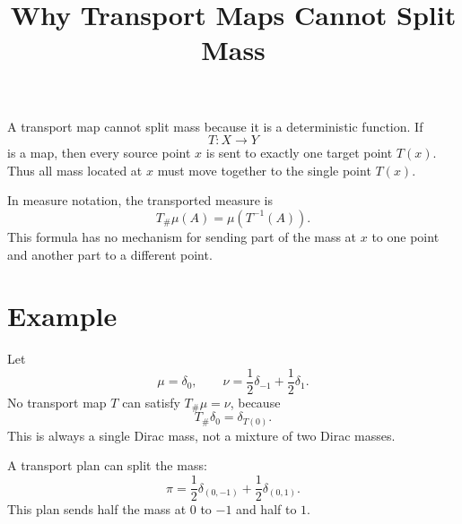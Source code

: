\documentclass[11pt]{article}
\title{Why Transport Maps Cannot Split Mass}
\author{}
\date{}
\begin{document}
\maketitle

A transport map cannot split mass because it is a deterministic function.
If
\[
T:X\to Y
\]
is a map, then every source point $x$ is sent to exactly one target point
$T(x)$. Thus all mass located at $x$ must move together to the single point
$T(x)$.

In measure notation, the transported measure is
\[
T_\#\mu(A)=\mu(T^{-1}(A)).
\]
This formula has no mechanism for sending part of the mass at $x$ to one point
and another part to a different point.

\section*{Example}

Let
\[
\mu=\delta_0,
\qquad
\nu=\frac12\delta_{-1}+\frac12\delta_1.
\]
No transport map $T$ can satisfy $T_\#\mu=\nu$, because
\[
T_\#\delta_0=\delta_{T(0)}.
\]
This is always a single Dirac mass, not a mixture of two Dirac masses.

A transport plan can split the mass:
\[
\pi
=
\frac12\delta_{(0,-1)}
+
\frac12\delta_{(0,1)}.
\]
This plan sends half the mass at $0$ to $-1$ and half to $1$.
\end{document}
